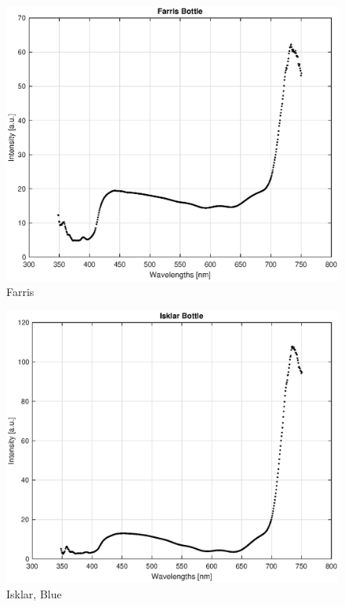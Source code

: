 \begin{appendices}
\begin{figure}
    \centering
    \includegraphics[width = 12cm]{Images/appendix/farris.eps}
    \caption{Farris}
    \label{fig:my_label}
\end{figure}

\begin{figure}
    \centering
    \includegraphics[width = 12cm]{Images/appendix/isklar_blue.eps}
    \caption{Isklar, Blue}
    \label{fig:isklar}
\end{figure}


\end{appendices}
